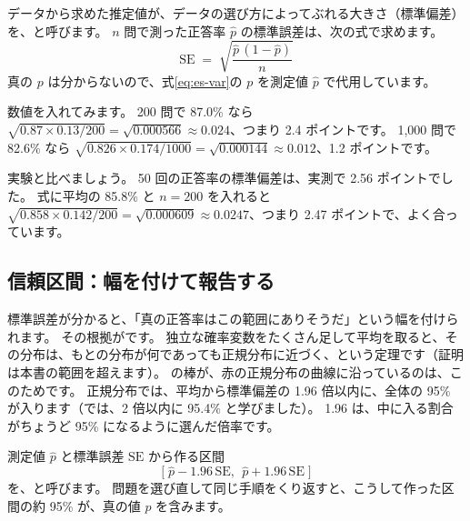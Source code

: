 \begin{definition}[標準誤差]\label{def:es-se}
データから求めた推定値が、データの選び方によってぶれる大きさ（標準偏差）を、と呼びます。
$n$ 問で測った正答率 $\hat p$ の標準誤差は、次の式で求めます。
\begin{equation}
\mathrm{SE} \;=\; \sqrt{\frac{\hat p\,(1-\hat p)}{n}}
\label{eq:es-se}
\end{equation}
真の $p$ は分からないので、式\eqref{eq:es-var}の $p$ を測定値 $\hat p$ で代用しています。
\end{definition}

数値を入れてみます。
200 問で 87.0\% なら $\sqrt{0.87\times0.13/200}=\sqrt{0.000566}\approx0.024$、つまり 2.4 ポイントです。
1,000 問で 82.6\% なら $\sqrt{0.826\times0.174/1000}=\sqrt{0.000144}\approx0.012$、1.2 ポイントです。

実験と比べましょう。
50 回の正答率の標準偏差は、実測で 2.56 ポイントでした。
式に平均の 85.8\% と $n=200$ を入れると $\sqrt{0.858\times0.142/200}=\sqrt{0.000609}\approx0.0247$、つまり 2.47 ポイントで、よく合っています。

\subsection*{信頼区間：幅を付けて報告する}

標準誤差が分かると、「真の正答率はこの範囲にありそうだ」という幅を付けられます。
その根拠がです。
独立な確率変数をたくさん足して平均を取ると、その分布は、もとの分布が何であっても正規分布に近づく、という定理です（証明は本書の範囲を超えます）。
の棒が、赤の正規分布の曲線に沿っているのは、このためです。
正規分布では、平均から標準偏差の 1.96 倍以内に、全体の 95\% が入ります（では、2 倍以内に 95.4\% と学びました）。
1.96 は、中に入る割合がちょうど 95\% になるように選んだ倍率です。

\begin{definition}[95\% 信頼区間]\label{def:es-ci}
測定値 $\hat p$ と標準誤差 $\mathrm{SE}$ から作る区間
\begin{equation}
\bigl[\;\hat p-1.96\,\mathrm{SE},\ \ \hat p+1.96\,\mathrm{SE}\;\bigr]
\label{eq:es-ci}
\end{equation}
を、と呼びます。
問題を選び直して同じ手順をくり返すと、こうして作った区間の約 95\% が、真の値 $p$ を含みます。
\end{definition}

